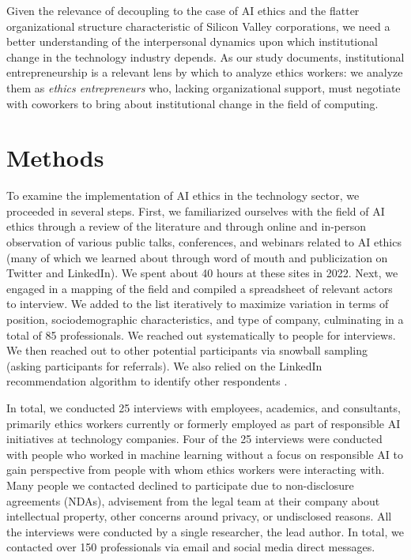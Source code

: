 \documentclass[sigconf]{acmart}
\begin{document}
Given the relevance of decoupling to the case of AI ethics and the flatter organizational structure characteristic of Silicon Valley corporations, we need a better understanding of the interpersonal dynamics upon which institutional change in the technology industry depends. As our study documents, institutional entrepreneurship is a relevant lens by which to analyze ethics workers: we analyze them as \textit{ethics entrepreneurs} who, lacking organizational support, must negotiate with coworkers to bring about institutional change in the field of computing.


\section{Methods}

To examine the implementation of AI ethics in the technology sector, we proceeded in several steps. First, we familiarized ourselves with the field of AI ethics through a review of the literature and through online and in-person observation of various public talks, conferences, and webinars related to AI ethics (many of which we learned about through word of mouth and publicization on Twitter and LinkedIn). We spent about 40 hours at these sites in 2022. Next, we engaged in a mapping of the field and compiled a spreadsheet of relevant actors to interview. We added to the list iteratively to maximize variation in terms of position, sociodemographic characteristics, and type of company, culminating in a total of 85 professionals. We reached out systematically to people for interviews. We then reached out to other potential participants via snowball sampling (asking participants for referrals). We also relied on the LinkedIn recommendation algorithm to identify other respondents \cite{christin_ethnographer_2020}.

In total, we conducted 25 interviews with employees, academics, and consultants, primarily ethics workers currently or formerly employed as part of responsible AI initiatives at technology companies. Four of the 25 interviews were conducted with people who worked in machine learning without a focus on responsible AI to gain perspective from people with whom ethics workers were interacting with. Many people we contacted declined to participate due to non-disclosure agreements (NDAs), advisement from the legal team at their company about intellectual property, other concerns around privacy, or undisclosed reasons. All the interviews were conducted by a single researcher, the lead author. In total, we contacted over 150 professionals via email and social media direct messages.
\end{document}
